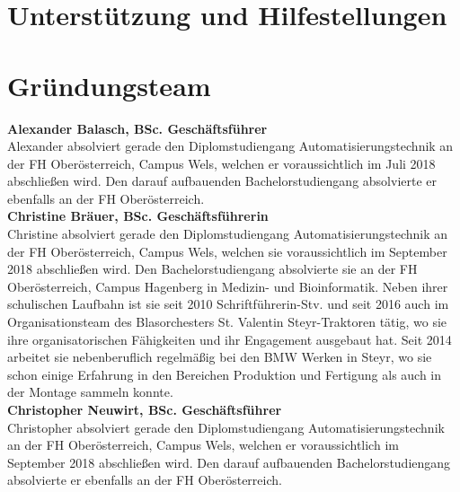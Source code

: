 \section{Unterstützung und Hilfestellungen}

\section{Gründungsteam}
\textbf{Alexander Balasch, BSc. Geschäftsführer} \\
Alexander absolviert gerade den Diplomstudiengang Automatisierungstechnik an der FH Oberösterreich, Campus Wels, welchen er voraussichtlich im Juli 2018 abschließen wird. Den darauf aufbauenden Bachelorstudiengang absolvierte er ebenfalls an der FH Oberösterreich. \\ %


\textbf{Christine Bräuer, BSc. Geschäftsführerin} \\
Christine absolviert gerade den Diplomstudiengang Automatisierungstechnik an der FH Oberösterreich, Campus Wels, welchen sie voraussichtlich im September 2018 abschließen wird. Den Bachelorstudiengang absolvierte sie an der FH Oberösterreich, Campus Hagenberg in Medizin- und Bioinformatik. 
Neben ihrer schulischen Laufbahn ist sie seit 2010 Schriftführerin-Stv. und seit 2016 auch im Organisationsteam des Blasorchesters St. Valentin Steyr-Traktoren tätig, wo sie ihre organisatorischen Fähigkeiten und ihr Engagement ausgebaut hat. Seit 2014 arbeitet sie nebenberuflich regelmäßig bei den BMW Werken in Steyr, wo sie schon einige Erfahrung in den Bereichen Produktion und Fertigung als auch in der Montage sammeln konnte. \\

\textbf{Christopher Neuwirt, BSc. Geschäftsführer} \\
Christopher absolviert gerade den Diplomstudiengang Automatisierungstechnik an der FH Oberösterreich, Campus Wels, welchen er voraussichtlich im September 2018 abschließen wird. Den darauf aufbauenden Bachelorstudiengang absolvierte er ebenfalls an der FH Oberösterreich.\\ %

